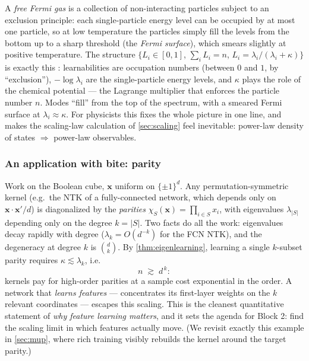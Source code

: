 \documentclass[11pt]{article}
\newcommand{\bv}[1]{\boldsymbol{#1}}
\begin{document}
\begin{remark}
\label{rem:fermi}
A \emph{free Fermi gas} is a collection of non-interacting particles
subject to an exclusion principle: each single-particle energy level can be
occupied by at most one particle, so at low temperature the particles
simply fill the levels from the bottom up to a sharp threshold (the
\emph{Fermi surface}), which smears slightly at positive temperature. The
structure $\{L_i \in [0,1]$, $\sum_i L_i = n$, $L_i =
\lambda_i/(\lambda_i + \kappa)\}$ is exactly this
\cite{simon2023eigenlearning}: learnabilities are occupation numbers
(between $0$ and $1$, by ``exclusion''), $-\log\lambda_i$ are the
single-particle energy levels, and $\kappa$ plays the role of the chemical
potential --- the Lagrange multiplier that enforces the particle number
$n$. Modes ``fill'' from the top of the spectrum, with a smeared Fermi
surface at $\lambda_i \approx \kappa$. For physicists this fixes the whole
picture in one line, and makes the scaling-law calculation of
\cref{sec:scaling} feel inevitable: power-law density of states
$\Rightarrow$ power-law observables.
\end{remark}

\subsubsection{An application with bite: parity}
\label{sec:parity}

Work on the Boolean cube, $\bv{x}$ uniform on $\{\pm 1\}^d$. Any
permutation-symmetric kernel (e.g.\ the NTK of a fully-connected network,
which depends only on $\bv{x}\cdot\bv{x}'/d$) is diagonalized by the
\emph{parities} $\chi_S(\bv{x}) = \prod_{i \in S} x_i$, with eigenvalues
$\lambda_{|S|}$ depending only on the degree $k = |S|$. Two facts do all the
work: eigenvalues decay rapidly with degree ($\lambda_k = O(d^{-k})$ for the
FCN NTK), and the degeneracy at degree $k$ is $\binom{d}{k}$. By
\cref{thm:eigenlearning}, learning a single $k$-subset parity requires
$\kappa \lesssim \lambda_k$, i.e.
\begin{equation}
  n \;\gtrsim\; d^{\,k} :
\end{equation}
kernels pay for high-order parities at a sample cost exponential in the
order. A network that \emph{learns features} --- concentrates its
first-layer weights on the $k$ relevant coordinates --- escapes this
scaling. This is the cleanest quantitative statement of \emph{why feature
learning matters}, and it sets the agenda for Block 2: find the scaling
limit in which features actually move. (We revisit exactly this example in
\cref{sec:mup}, where rich training visibly rebuilds the kernel around the
target parity.)
\end{document}
